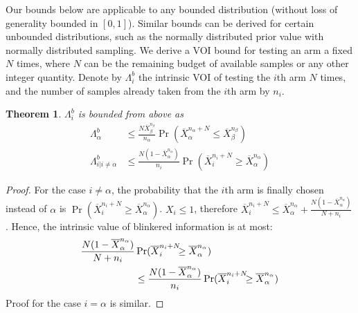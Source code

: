 \documentclass[]{article}
\newtheorem{thm}{Theorem}
\begin{document}
Our bounds below are applicable to any bounded distribution (without loss of generality 
bounded in $[0,1]$). Similar
bounds can be derived for certain unbounded distributions, such as the
normally distributed prior value with normally distributed
sampling.
We derive a VOI bound for testing an arm a fixed $N$ times,
where $N$ can be the remaining budget of available samples or
any other integer quantity.
Denote by  $\Lambda_i^b$ the intrinsic VOI of testing the $i$th arm
$N$ times, and the number of
samples already taken from the $i$th arm by $n_i$.
\begin{thm} $\Lambda_i^b$ is bounded from above as
\begin{align}
\label{eqn:thm-be}
  \Lambda_\alpha^b&\le \frac {N \overline X_\beta^{n_\beta}} {n_\alpha} \Pr(\overline X_\alpha^{n_\alpha+N}\le\overline X_\beta^{n_\beta})\nonumber\\
\Lambda_{i|i\ne\alpha}^b&\le \frac {N(1-\overline X_\alpha^{n_\alpha})} {n_i}\Pr(\overline   X_i^{{n_i}+N}\ge\overline X_\alpha^{n_\alpha})
\end{align}
\label{thm:be}
\end{thm}
\begin{hiddenproof}
	\vspace{-2em}
	\begin{proof} For the case $i\ne \alpha$, the probability that the
	  $i$th arm is finally chosen instead of $\alpha$ is
	  $\Pr(\overline X_i^{n_i+N} \ge \overline X_\alpha^{n_\alpha})$. $X_i \le 1$,
	  therefore $\overline X_i^{n_i+N}\le \overline
	  X_\alpha^{n_\alpha}+\frac {N(1-\overline X_\alpha^{n_\alpha})} {N+n_i}$. Hence, the intrinsic value of blinkered
	  information is at most: 
	\begin{align}
	\label{eq:simplistic}
	\frac{ N(1-\overline  X_\alpha^{n_\alpha})}
	  {N+n_i}&\Pr(\overline X_i^{{n_i}+N}\hspace{-0.5em}\ge\overline X_\alpha^{n_\alpha})\nonumber \\
	&\le\frac{ N(1-\overline  X_\alpha^{n_\alpha})}
	{n_i}\Pr(\overline X_i^{{n_i}+N}\hspace{-0.5em}\ge\overline X_\alpha^{n_\alpha})
	\end{align}
	  Proof for the case $i=\alpha$ is similar.
	\end{proof}		
\end{hiddenproof}
\end{document}
